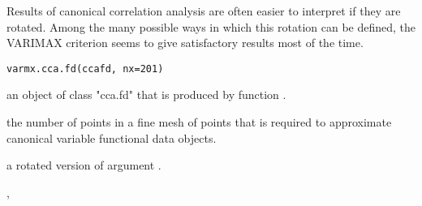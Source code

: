 \begin{Description}\relax
Results of canonical correlation analysis are often easier to interpret if
they are rotated.  Among the many possible ways in which this rotation can be
defined, the VARIMAX criterion seems to give satisfactory results most
of the time.
\end{Description}
\begin{Usage}
\begin{verbatim}
varmx.cca.fd(ccafd, nx=201)
\end{verbatim}
\end{Usage}
\begin{Arguments}
\begin{ldescription}
\item[\code{ccafd}] an object of class "cca.fd" that is produced by function
.

\item[\code{nx}] the number of points in a fine mesh of points that is
required to approximate canonical variable functional
data objects.

\end{ldescription}
\end{Arguments}
\begin{Value}
a rotated version of argument .
\end{Value}
\begin{SeeAlso}\relax
{}, 
\end{SeeAlso}

